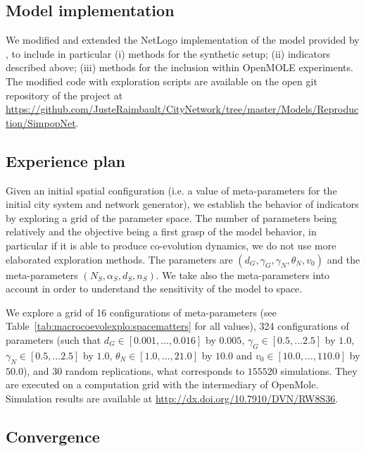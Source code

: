 \documentclass[graybox]{svmult}
\begin{document}
\subsection{Model implementation}

We modified and extended the NetLogo implementation of the model provided by \cite{schmitt2014modelisation}, to include in particular (i) methods for the synthetic setup; (ii) indicators described above; (iii) methods for the inclusion within OpenMOLE experiments. The modified code with exploration scripts are available on the open git repository of the project at \url{https://github.com/JusteRaimbault/CityNetwork/tree/master/Models/Reproduction/SimpopNet}.



\subsection{Experience plan}

Given an initial spatial configuration (i.e. a value of meta-parameters for the initial city system and network generator), we establish the behavior of indicators by exploring a grid of the parameter space. The number of parameters being relatively and the objective being a first grasp of the model behavior, in particular if it is able to produce co-evolution dynamics, we do not use more elaborated exploration methods. The parameters are $(d_G,\gamma_G,\gamma_N,\theta_N,v_0)$ and the meta-parameters $(N_S,\alpha_S,d_S,n_S)$. We take also the meta-parameters into account in order to understand the sensitivity of the model to space.

We explore a grid of 16 configurations of meta-parameters (see Table~\ref{tab:macrocoevolexplo:spacematters} for all values), 324 configurations of parameters (such that $d_G \in \left[0.001, \ldots , 0.016\right]$ by $0.005$, $\gamma_G \in \left[0.5 , \ldots 2.5\right]$ by $1.0$, $\gamma_N \in \left[0.5 , \ldots 2.5\right]$ by $1.0$, $\theta_N \in \left[1.0 , \ldots , 21.0\right]$ by $10.0$ and $v_0 \in \left[10.0, \ldots , 110.0\right]$ by $50.0$), and 30 random replications, what corresponds to $155520$ simulations. They are executed on a computation grid with the intermediary of OpenMole. Simulation results are available at \url{http://dx.doi.org/10.7910/DVN/RW8S36}.



\subsection{Convergence}
\end{document}

